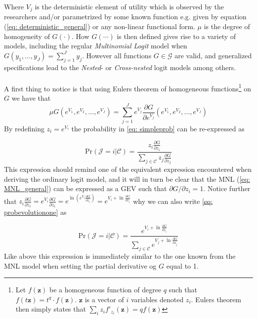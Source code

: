 Where $V_j$ is the deterministic element of utility which is observed by the researchers and/or parametrized by some known function e.g. given by equation (\ref{eq: deterministic_general}) or any non-linear functional form. $\mu$ is the degree of homogeneity of $G(\cdot)$. How $G(\cdots)$ is then defined gives rise to a variety of models, including the regular \textit{Multinomial Logit} model when $G(y_1, ..., y_J) = \sum_{j=1}^J y_j$. However all functions $G \in \mathcal{G}$ are valid, and generalized specifications lead to the \textit{Nested}- or \textit{Cross-nested} logit models among others.
\\ \\
A first thing to notice is that using Eulers theorem of homogeneous functions\footnote{Let $f(\bm{z})$ be a homogeneous function of degree $q$ such that $f(t\bm{z}) = t^{q} \cdot f(\bm{z})$. $\bm{z}$ is a vector of $i$ variables denoted $z_i$. Eulers theorem then simply states that $\sum_{i} z_i f'_{z_i}(\bm{z}) = q f(\bm{z})$} on $G$ we have that
  \begin{equation}
 \mu  G(e^{V_1}, e^{V_2}, ..., e^{V_J}) = \sum\limits_{j=1}^J e^{V_j} \frac{\partial G}{\partial e^{V_j}}(e^{V_1}, e^{V_2}, ..., e^{V_J})
  \end{equation}
By redefining $z_i=e^{V_i}$ the probability in \eqref{eq: simpleprob} can be re-expressed as

  \begin{equation} \label{eq: probevolutionone}
   \textrm{Pr}(\mathcal{J} = i| \mathcal{C}) = \frac{z_i \frac{\partial G}{\partial z_i} }{\sum\limits_{j \in \mathcal{C}} z_j \frac{\partial G}{\partial z_j} }
  \end{equation}
This expression should remind one of the equivalent expression encountered when deriving the ordinary logit model, and it will in turn be clear that the MNL (\ref{eq: MNL_general}) can be expressed as a GEV such that $\partial G / \partial z_i = 1$.
Notice further that $z_i \frac{\partial G}{\partial z_i} = e^{V_i}\frac{\partial G}{\partial z_i} = e^{\ln(e^{V_i} \frac{\partial G}{\partial z_i})} = e^{V_i + \ln \frac{\partial G}{\partial z_i}}$ why we can also write \eqref{eq: probevolutionone} as

  \begin{equation} \label{eq: probevolutiontwo}
   \textrm{Pr}(\mathcal{J} = i|\mathcal{C}) = \frac{e^{V_i + \ln \frac{\partial G}{\partial z_i} }}{ \sum\limits_{j \in \mathcal{C}} e^{V_j + \ln \frac{\partial G}{\partial z_j}} }
  \end{equation}
Like above this expression is immediately similar to the one known from the MNL model when setting the partial derivative og $G$ equal to 1. \citep{bierlaire_theoretical_2006}

